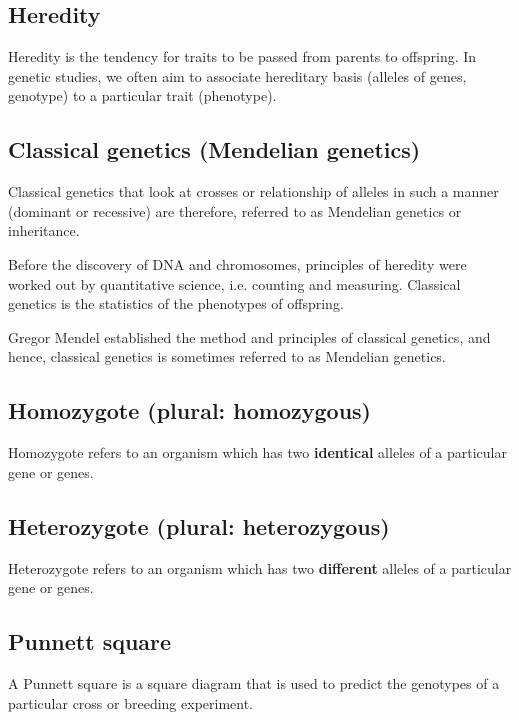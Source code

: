 \documentclass[11pt]{article}
\begin{document}
\subsection{Heredity}
\label{sec:orgf3eb50e}
Heredity is the tendency for traits to be passed from parents to offspring. In genetic studies, we often aim to associate hereditary basis (alleles of genes, genotype) to a particular trait (phenotype).
\subsection{Classical genetics (Mendelian genetics)}
\label{sec:org055d4e2}
Classical genetics that look at crosses or relationship of alleles in such a manner (dominant or recessive) are therefore, referred to as Mendelian genetics or inheritance.


Before the discovery of DNA and chromosomes, principles of heredity were worked out by quantitative science, i.e. counting and measuring. Classical genetics is the statistics of the phenotypes of offspring.


Gregor Mendel established the method and principles of classical genetics, and hence, classical genetics is sometimes referred to as Mendelian genetics.
\subsection{Homozygote (plural: homozygous)}
\label{sec:org9d33878}
Homozygote refers to an organism which has two \textbf{identical} alleles of a particular gene or genes.
\subsection{Heterozygote (plural: heterozygous)}
\label{sec:org854e585}
Heterozygote refers to an organism which has two \textbf{different} alleles of a particular gene or genes.

\newpage
\subsection{Punnett square}
\label{sec:orgb79cf39}
A Punnett square is a square diagram that is used to predict the genotypes of a particular cross or breeding experiment.
\end{document}
